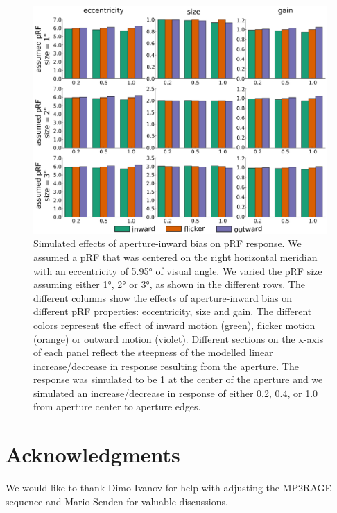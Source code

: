 \begin{figure}[htbp!]
\centering
\includegraphics[width=\textwidth]{figures/chapter_04/fig5b.eps}
\caption{Simulated effects of aperture-inward bias on pRF response. We assumed a pRF that was centered on the right horizontal meridian with an eccentricity of 5.95° of visual angle. We varied the pRF size assuming either 1°, 2° or 3°, as shown in the different rows. The different columns show the effects of aperture-inward bias on different pRF properties: eccentricity, size and gain. The different colors represent the effect of inward motion (green), flicker motion (orange) or outward motion (violet). Different sections on the x-axis of each panel reflect the steepness of the modelled linear increase/decrease in response resulting from the aperture. The response was simulated to be 1 at the center of the aperture and we simulated an increase/decrease in response of either 0.2, 0.4, or 1.0 from aperture center to aperture edges.}
\label{fig:trlEdge_res}
\end{figure}

\clearpage
\section{Acknowledgments}
We would like to thank Dimo Ivanov for help with adjusting the MP2RAGE sequence and Mario Senden for valuable discussions.

\stopsupplement
\clearpage
\printbibliography[heading=subbibnumbered, title={References}]